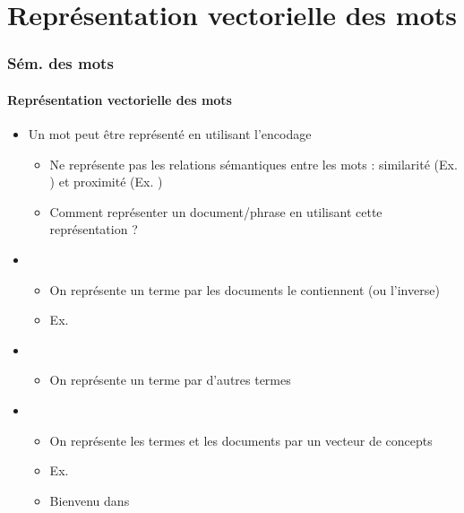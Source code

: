 \documentclass[xcolor=table]{beamer}
\begin{document}
\section{Représentation vectorielle des mots}

\begin{frame}
\frametitle{Sém. des mots}
\framesubtitle{Représentation vectorielle des mots}

\begin{itemize}
	\item Un mot peut être représenté en utilisant l'encodage  
	\begin{itemize}
		\item Ne représente pas les relations sémantiques entre les mots : similarité (Ex. ) et proximité (Ex. )
		\item Comment représenter un document/phrase en utilisant cette représentation ?
	\end{itemize}

	\item {}
	\begin{itemize}
		\item On représente un terme par les documents le contiennent (ou l'inverse)
		\item Ex. 
	\end{itemize}

	\item {}
	\begin{itemize}
		\item On représente un terme par d'autres termes
	\end{itemize}

	\item {}
	\begin{itemize}
		\item On représente les termes et les documents par un vecteur de concepts
		\item Ex. 
		\item Bienvenu dans 
	\end{itemize}

\end{itemize}

\end{frame}
\end{document}
